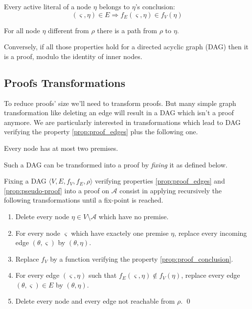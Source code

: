 \documentclass{llncs}
\begin{document}
\begin{property}
Every active literal of a node $\eta$ belongs to $\eta$'s conclusion:
\begin{equation*}
  (\varsigma,\eta) \in E \Rightarrow f_E(\varsigma,\eta) \in f_V(\eta)
\end{equation*}
\end{property}

\begin{property}
For all node $\eta$ different from $\rho$ there is a path from $\rho$ to $\eta$.
\end{property}

Conversely, if all those properties hold for a directed acyclic graph (DAG) then it is a proof,
modulo the identity of inner nodes.

\subsection{Proofs Transformations}

To reduce proofs' size we'll need to transform proofs. But many simple graph transformation like
deleting an edge will result in a DAG which isn't a proof anymore. We are particularly interested in
transformations which lead to DAG verifying the property \ref{prop:proof_edges} plus the following one.

\begin{property}
\label{prop:pseudo-proof}
Every node has at most two premises.
\end{property}

Such a DAG can be transformed into a proof by \emph{fixing} it as defined below.

\begin{definition}[Fixing]
Fixing a DAG $\langle V, E, f_V, f_E, \rho \rangle$ verifying properties \ref{prop:proof_edges} and
\ref{prop:pseudo-proof} into a proof on $\mathcal{A}$ consist in applying recursively the following
transformations until a fix-point is reached.
\begin{enumerate}
  \item Delete every node $\eta \in V \setminus \mathcal{A}$ which have no premise.
  \item For every node $\varsigma$ which have exactely one premise $\eta$, replace every incoming
    edge $(\theta,\varsigma)$ by $(\theta,\eta)$.
  \item Replace $f_V$ by a function verifying the property \ref{prop:proof_conclusion}.
  \item For every edge $(\varsigma,\eta)$ such that $f_E(\varsigma,\eta) \notin f_V(\eta)$, replace
    every edge $(\theta,\varsigma) \in E$ by $(\theta,\eta)$.
  \item Delete every node and every edge not reachable from $\rho$.
  \qed
\end{enumerate}
\end{definition}
\end{document}
